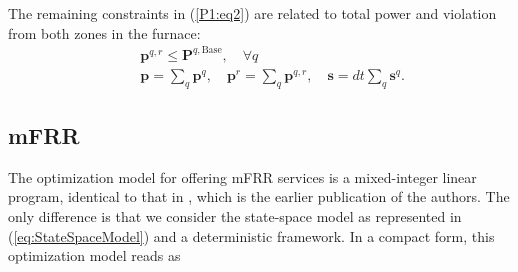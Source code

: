 \documentclass[conference]{IEEEtran}
\begin{document}
The remaining constraints in (\ref{P1:eq2}) are related to total power and violation from both zones in the furnace:
\begingroup
\allowdisplaybreaks
\begin{subequations} \label{P1:constraints-2}
    \begin{align}
        \quad & \bm{p}^{q,r} \leq \bm{P}^{q,\text{Base}} , \quad \forall{q} \label{P1:co8}
        \\
        \quad & \bm{p} = \sum_{q} \bm{p}^{q},
        \quad \bm{p}^{r} = \sum_{q} \bm{p}^{q,r},
        \quad \bm{s} = dt \sum_{q} \bm{s}^{q}.   \label{P1:co7}
    \end{align}
\end{subequations}
\endgroup

\vspace{-1mm}
\subsection{mFRR}
\vspace{-1mm}
The optimization model for offering mFRR services is a mixed-integer linear program, identical to that in \cite{gade2023load}, which is the earlier publication of the authors. The only difference is that we consider the state-space model as represented in  (\ref{eq:StateSpaceModel}) and a deterministic framework. In a compact form, this  optimization model reads as
%
%
\end{document}
